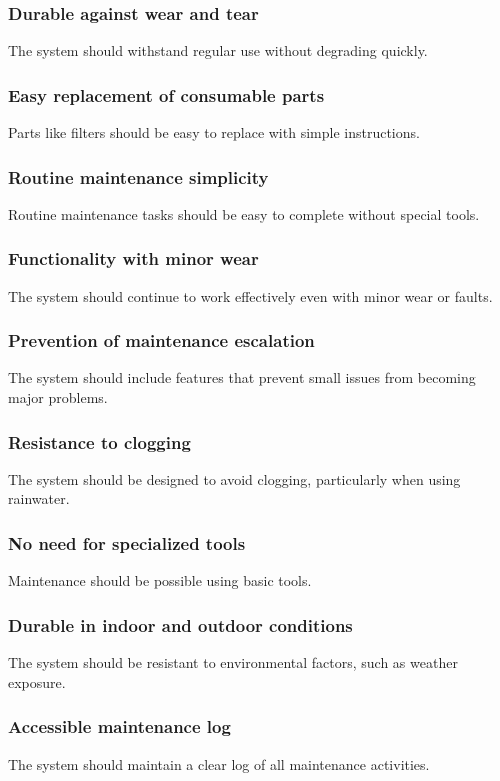 \documentclass[11pt]{article}
\begin{document}
\subsubsection{Durable against wear and tear}
The system should withstand regular use without degrading quickly.

\subsubsection{Easy replacement of consumable parts}
Parts like filters should be easy to replace with simple instructions.

\subsubsection{Routine maintenance simplicity}
Routine maintenance tasks should be easy to complete without special tools.

\subsubsection{Functionality with minor wear}
The system should continue to work effectively even with minor wear or faults.

\subsubsection{Prevention of maintenance escalation}
The system should include features that prevent small issues from becoming major problems.

\subsubsection{Resistance to clogging}
The system should be designed to avoid clogging, particularly when using rainwater.

\subsubsection{No need for specialized tools}
Maintenance should be possible using basic tools.

\subsubsection{Durable in indoor and outdoor conditions}
The system should be resistant to environmental factors, such as weather exposure.

\subsubsection{Accessible maintenance log}
The system should maintain a clear log of all maintenance activities.
\end{document}

